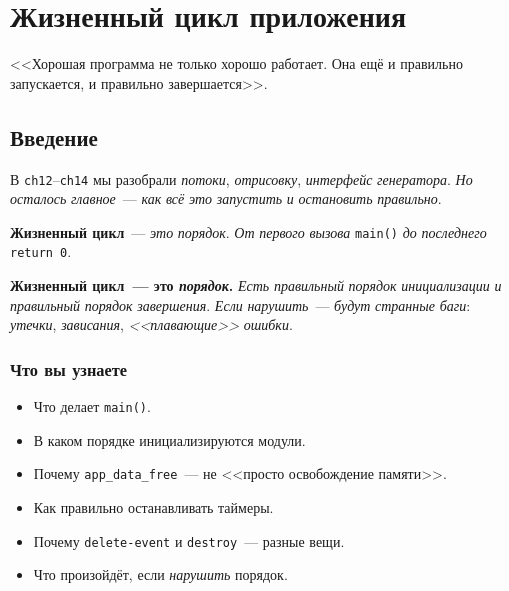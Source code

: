 
\chapter{Жизненный цикл приложения}
\label{ch:lifecycle}

\epigraph{<<Хорошая программа не только хорошо работает.
Она ещё и правильно запускается, и правильно завершается>>.}{}

\section{Введение}
\label{sec:lifecycle-intro}

В \texttt{ch12}--\texttt{ch14} мы разобрали \emph{потоки},
\emph{отрисовку}, \emph{интерфейс} \emph{генератора}. \emph{Но}
\emph{осталось} \emph{главное}~--- \emph{как} \emph{всё} \emph{это}
\emph{запустить} \emph{и} \emph{остановить} \emph{правильно}.

\textbf{Жизненный цикл}~--- \emph{это} \emph{порядок}. \emph{От}
\emph{первого} \emph{вызова} \texttt{main()} \emph{до}
\emph{последнего} \texttt{return 0}.

\begin{ideabox}
\textbf{Жизненный цикл~--- это \emph{порядок}.} \emph{Есть}
\emph{правильный} \emph{порядок} \emph{инициализации} \emph{и}
\emph{правильный} \emph{порядок} \emph{завершения}. \emph{Если}
\emph{нарушить}~--- \emph{будут} \emph{странные} \emph{баги}:
\emph{утечки}, \emph{зависания}, \emph{<<плавающие>>} \emph{ошибки}.
\end{ideabox}

\subsection{Что вы узнаете}

\begin{itemize}
    \item Что делает \texttt{main()}.
    \item В каком порядке инициализируются модули.
    \item Почему \texttt{app\_data\_free}~--- не <<просто
          освобождение памяти>>.
    \item Как правильно останавливать таймеры.
    \item Почему \texttt{delete-event} и \texttt{destroy}~---
          разные вещи.
    \item Что произойдёт, если \emph{нарушить} порядок.
\end{itemize}


